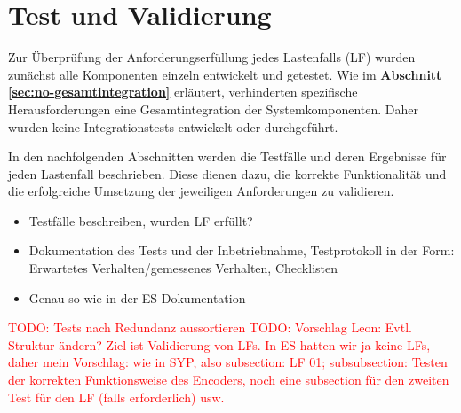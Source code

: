 \newpage
\section{Test und Validierung}
\label{sec:test-validation}
Zur Überprüfung der Anforderungserfüllung jedes Lastenfalls (LF) wurden zunächst alle Komponenten einzeln entwickelt und getestet. Wie im \textbf{Abschnitt \ref{sec:no-gesamtintegration}} erläutert, verhinderten spezifische Herausforderungen eine Gesamtintegration der Systemkomponenten. Daher wurden keine Integrationstests entwickelt oder durchgeführt.

In den nachfolgenden Abschnitten werden die Testfälle und deren Ergebnisse für jeden Lastenfall beschrieben. Diese dienen dazu, die korrekte Funktionalität und die erfolgreiche Umsetzung der jeweiligen Anforderungen zu validieren.


\begin{itemize}
	\item Testfälle beschreiben, wurden LF erfüllt?
	\item Dokumentation des Tests und der Inbetriebnahme, Testprotokoll in der Form: Erwartetes Verhalten/gemessenes Verhalten, Checklisten
	\item Genau so wie in der ES Dokumentation
\end{itemize}

\textcolor{red}{TODO: Tests nach Redundanz aussortieren}
\textcolor{red}{TODO: Vorschlag Leon: Evtl. Struktur ändern? Ziel ist Validierung von LFs. In ES hatten wir ja keine LFs, daher mein Vorschlag: wie in SYP, also subsection: LF 01; subsubsection: Testen der korrekten Funktionsweise des Encoders, noch eine subsection für den zweiten Test für den LF (falls erforderlich) usw.}







